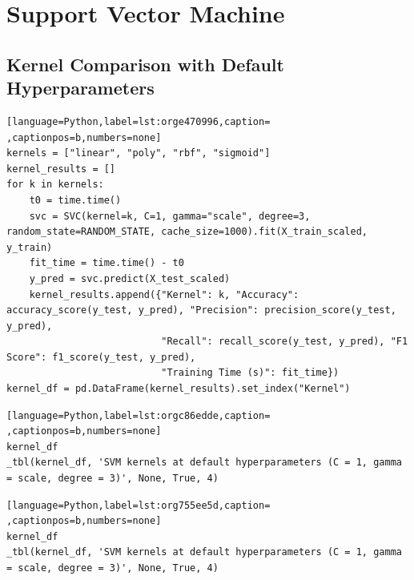 \documentclass[11pt]{article}
\begin{document}
\section*{Support Vector Machine}
\label{sec:org31c9ee2}


\subsection*{Kernel Comparison with Default Hyperparameters}
\label{sec:org9b52385}

\begin{lstlisting}[language=Python,label=lst:orge470996,caption= ,captionpos=b,numbers=none]
kernels = ["linear", "poly", "rbf", "sigmoid"]
kernel_results = []
for k in kernels:
    t0 = time.time()
    svc = SVC(kernel=k, C=1, gamma="scale", degree=3, random_state=RANDOM_STATE, cache_size=1000).fit(X_train_scaled, y_train)
    fit_time = time.time() - t0
    y_pred = svc.predict(X_test_scaled)
    kernel_results.append({"Kernel": k, "Accuracy": accuracy_score(y_test, y_pred), "Precision": precision_score(y_test, y_pred),
                           "Recall": recall_score(y_test, y_pred), "F1 Score": f1_score(y_test, y_pred),
                           "Training Time (s)": fit_time})
kernel_df = pd.DataFrame(kernel_results).set_index("Kernel")
\end{lstlisting}

\begin{lstlisting}[language=Python,label=lst:orgc86edde,caption= ,captionpos=b,numbers=none]
kernel_df
_tbl(kernel_df, 'SVM kernels at default hyperparameters (C = 1, gamma = scale, degree = 3)', None, True, 4)
\end{lstlisting}
\begin{lstlisting}[language=Python,label=lst:org755ee5d,caption= ,captionpos=b,numbers=none]
kernel_df
_tbl(kernel_df, 'SVM kernels at default hyperparameters (C = 1, gamma = scale, degree = 3)', None, True, 4)
\end{lstlisting}
\end{document}
